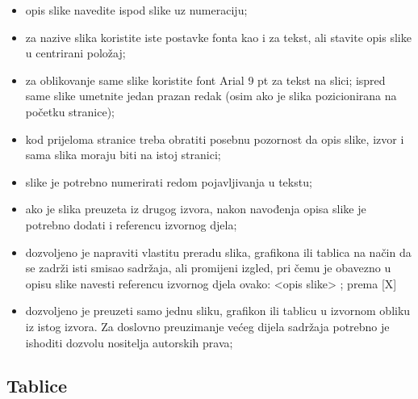 \documentclass[]{foi}
\begin{document}
\begin{itemize}
    \item opis slike navedite ispod slike uz numeraciju;
    
    \item za nazive slika koristite iste postavke fonta kao i za tekst, ali stavite opis slike u centrirani položaj;

    \item za oblikovanje same slike koristite font Arial 9 pt za tekst na slici;
ispred same slike umetnite jedan prazan redak (osim ako je slika pozicionirana na početku stranice);

    \item kod prijeloma stranice treba obratiti posebnu pozornost da opis slike, izvor i sama slika moraju biti na istoj stranici; 

    \item slike je potrebno numerirati redom pojavljivanja u tekstu;

    \item ako je slika preuzeta iz drugog izvora, nakon navođenja opisa slike je potrebno dodati i referencu izvornog djela;

    \item dozvoljeno je napraviti vlastitu preradu slika, grafikona ili tablica na način da se zadrži isti smisao sadržaja, ali promijeni izgled, pri čemu je obavezno u opisu slike navesti referencu izvornog djela ovako: <opis slike> ; prema [X]

    \item dozvoljeno je preuzeti samo jednu sliku, grafikon ili tablicu u izvornom obliku iz istog izvora. Za doslovno preuzimanje većeg dijela sadržaja potrebno je ishoditi dozvolu nositelja autorskih prava;

\end{itemize}


\subsection{Tablice}
\end{document}
